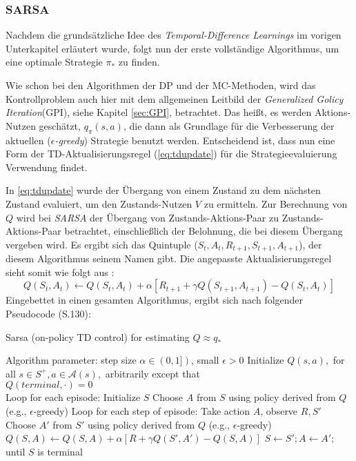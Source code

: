 \subsubsection{SARSA}
Nachdem die grundsätzliche Idee des \textit{Temporal-Difference Learnings} im vorigen Unterkapitel erläutert wurde, folgt nun der erste vollständige Algorithmus, um eine optimale Strategie $\pi_*$ zu finden.
\par 
Wie schon bei den Algorithmen der DP und der MC-Methoden, wird das Kontrollproblem auch hier mit dem allgemeinen Leitbild der \textit{Generalized Golicy Iteration}(GPI), siehe Kapitel \ref{sec:GPI}, betrachtet. Das heißt, es werden Aktions-Nutzen geschätzt, $q_\pi(s,a)$, die dann als Grundlage für die Verbesserung der aktuellen ($\epsilon$\textit{-greedy}) Strategie benutzt werden. Entscheidend ist, dass nun eine Form der TD-Aktualisierungsregel (\ref{eq:tdupdate}) für die Strategieevaluierung Verwendung findet.
\par 
In \ref{eq:tdupdate} wurde der Übergang von einem Zustand zu dem nächsten Zustand evaluiert, um den Zustands-Nutzen $V$ zu ermitteln. Zur Berechnung von $Q$ wird bei \textit{SARSA} der Übergang von Zustands-Aktions-Paar zu Zustands-Aktions-Paar betrachtet, einschließlich der Belohnung, die bei diesem Übergang vergeben wird. Es ergibt sich das Quintuple ($S_t, A_t, R_{t+1}, S_{t+1}, A_{t+1}$), der diesem Algorithmus seinem Namen gibt. Die angepasste Aktualisierungsregel sieht somit wie folgt aus \cite[S.~129]{Sutton1998}:
\begin{equation}
    Q(S_t, A_t) \gets Q(S_t, A_t) + \alpha \left[R_{t+1} + \gamma Q(S_{t+1}, A_{t+1}) - Q(S_t, A_t)\right]
\end{equation}
\newpage
Eingebettet in einen gesamten Algorithmus, ergibt sich nach \cite{Sutton1998} folgender Pseudocode (S.130): 
\begin{algorithm}
    \caption{Sarsa (on-policy TD control) for estimating $Q \approx q_*$}
    \begin{algorithmic}[1]
        \State Algorithm parameter: step size $\alpha \in (0,1])$, small $\epsilon > 0$
        \State Initialize $Q(s,a),$ for all $s \in S^+, a \in \mathcal{A}(s),$ arbitrarily except that \\ $Q(terminal, \mathord{\cdot}) = 0$
        \\
        \State Loop for each episode:
        \Indent
            \State Initialize $S$
            \State Choose $A$ from $S$ using policy derived from $Q$ (e.g., $\epsilon$-greedy)
            \State Loop for each step of episode:
            \Indent
                \State Take action $A$, observe $R, S'$
                \State Choose $A'$ from $S'$ using policy derived from $Q$ (e.g., $\epsilon$-greedy)
                \State $Q(S,A) \gets Q(S,A) + \alpha [R + \gamma Q(S',A') - Q(S,A)]$
                \State $S \gets S'; A \gets A';$
            \EndIndent
            \State until $S$ is terminal
        \EndIndent 
    \end{algorithmic}
\end{algorithm}
